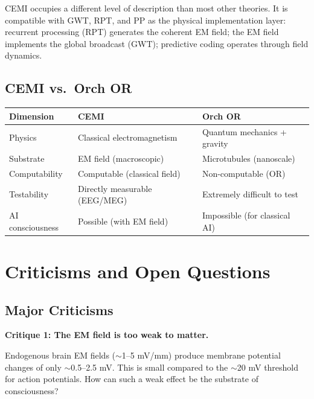 \documentclass[11pt,a4paper]{report}
\begin{document}
CEMI occupies a different level of description than most other theories. It is compatible with GWT, RPT, and PP as the physical implementation layer: recurrent processing (RPT) generates the coherent EM field; the EM field implements the global broadcast (GWT); predictive coding operates through field dynamics.

\section{CEMI vs.\ Orch OR}

\begin{compbox}
\renewcommand{\arraystretch}{1.4}
\begin{tabular}{>{\raggedright}p{3cm} >{\raggedright}p{5.2cm} >{\raggedright\arraybackslash}p{4.8cm}}
  \toprule
  \textbf{Dimension} & \textbf{CEMI} & \textbf{Orch OR} \\
  \midrule
  Physics & Classical electromagnetism & Quantum mechanics + gravity \\
  Substrate & EM field (macroscopic) & Microtubules (nanoscale) \\
  Computability & Computable (classical field) & Non-computable (OR) \\
  Testability & Directly measurable (EEG/MEG) & Extremely difficult to test \\
  AI consciousness & Possible (with EM field) & Impossible (for classical AI) \\
  \bottomrule
\end{tabular}
\end{compbox}


\chapter{Criticisms and Open Questions}

\section{Major Criticisms}

\textbf{Critique 1: The EM field is too weak to matter.}

\begin{objbox}
Endogenous brain EM fields ($\sim$1--5 mV/mm) produce membrane potential changes of only $\sim$0.5--2.5 mV. This is small compared to the $\sim$20 mV threshold for action potentials. How can such a weak effect be the substrate of consciousness?
\end{objbox}
\end{document}
